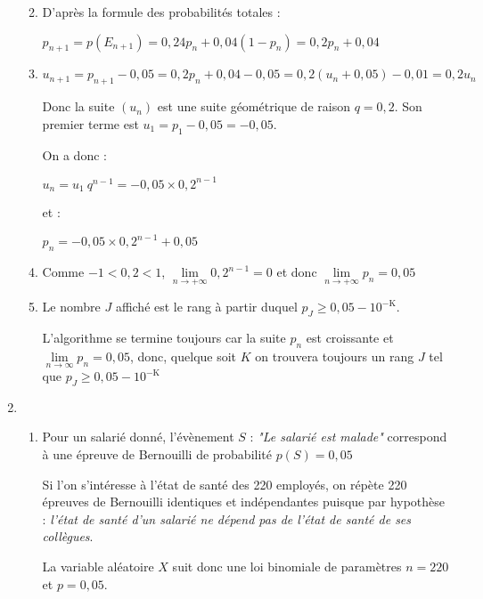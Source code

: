 \begin{corrige}
\begin{enumerate}
\begin{enumerate}[label=\alph*.]
\begin{center}
\end{center}
\item
               D'après la formule des probabilités totales :
               \par
               $p_{n+1}=p\left(E_{n+1}\right)=0,24p_{n}+0,04\left(1-p_{n}\right)=0,2p_{n}+0,04$
               \item
               $u_{n+1}=p_{n+1}-0,05=0,2p_{n}+0,04-0,05=0,2\left(u_{n}+0,05\right)-0,01=0,2u_{n}$
               \par
               Donc la suite $\left(u_{n}\right)$ est une suite géométrique de raison $q=0,2$. Son premier terme est $u_{1}=p_{1}-0,05=-0,05$.
               \par
               On a donc :
               \par
               $u_{n}=u_1\ q^{n-1}=-0,05\times 0,2^{n-1}$
               \par
               et :
               \par
               $p_{n}=-0,05\times 0,2^{n-1}+0,05$
               \item
               Comme $-1 < 0,2 < 1$, $\lim\limits_{n\rightarrow +\infty }0,2^{n-1}=0$ et donc $\lim\limits_{n\rightarrow +\infty }p_{n}=0,05$
               \item
               Le nombre $J$ affiché est le rang à partir duquel $p_{J}\geqslant  0,05-10^{- \text{K}}$.
               \par
               L'algorithme se termine toujours car la suite $p_{n}$ est croissante et $\lim\limits_{n\rightarrow \infty }p_{n}=0,05$, donc, quelque soit $K$ on trouvera toujours un rang $J$ tel que $p_{J}\geqslant  0,05-10^{- \text{K}}$
          \end{enumerate}
          \item
          \begin{enumerate}[label=\alph*.]
               \item
               Pour un salarié donné, l'évènement $S$ : \textit{"Le salarié est malade"}  correspond à une épreuve de Bernouilli de probabilité $p\left(S\right)=0,05$
               \par
               Si l'on s'intéresse à l'état de santé des 220 employés, on répète 220 épreuves de Bernouilli identiques et indépendantes puisque par hypothèse : \textit{l'état de santé d'un salarié ne dépend pas de l'état de santé de ses collègues}.
               \par
               La variable aléatoire $X$ suit donc une loi binomiale de paramètres $n=220$ et $p=0,05$.

\end{enumerate}
\end{enumerate}
\end{corrige}
